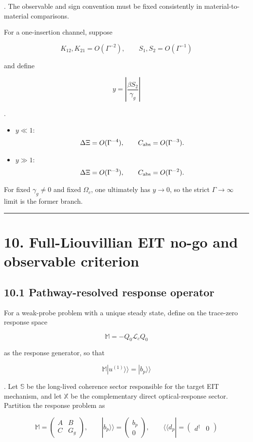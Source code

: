 \documentclass[
  10pt,
  a4paper,
]{article}
\providecommand{\tightlist}{%
  \setlength{\itemsep}{0pt}\setlength{\parskip}{0pt}}
\begin{document}
. The observable and sign convention must be fixed consistently in
material-to-material comparisons.

For a one-insertion channel, suppose

\[
K_{12},K_{21}=O(\Gamma^{-2}),
\qquad
S_1,S_2=O(\Gamma^{-1})
\]

and define

\[
y=\left|\frac{\beta S_2}{\gamma_g}\right|
\]

.

\begin{itemize}
\tightlist
\item
  \(y\ll1\): \[
  \Delta\Xi=O(\Gamma^{-4}),
  \qquad
  C_{\rm abs}=O(\Gamma^{-3}).
  \]
\item
  \(y\gg1\): \[
  \Delta\Xi=O(\Gamma^{-3}),
  \qquad
  C_{\rm abs}=O(\Gamma^{-2}).
  \]
\end{itemize}

For fixed \(\gamma_g\neq0\) and fixed \(\Omega_c\), one ultimately has
\(y\to0\), so the strict \(\Gamma\to\infty\) limit is the former branch.

\begin{center}\rule{0.5\linewidth}{0.5pt}\end{center}

\section{10. Full-Liouvillian EIT no-go and observable
criterion}\label{full-liouvillian-eit-no-go-and-observable-criterion}

\subsection{10.1 Pathway-resolved response
operator}\label{pathway-resolved-response-operator}

For a weak-probe problem with a unique steady state, define on the
trace-zero response space

\[
\mathbb M=-Q_0\mathcal L_cQ_0
\]

as the response generator, so that

\[
\mathbb M|u^{(1)}\rangle\!\rangle
=|b_p\rangle\!\rangle
\]

. Let \(\mathbb S\) be the long-lived coherence sector responsible for
the target EIT mechanism, and let \(\mathbb X\) be the complementary
direct optical-response sector. Partition the response problem as

\[
\mathbb M=
\begin{pmatrix}
A&B\\
C&G_g
\end{pmatrix},
\qquad
|b_p\rangle\!\rangle=
\begin{pmatrix}b_p\\0\end{pmatrix},
\qquad
\langle\!\langle d_p|=
\begin{pmatrix}d^\dagger&0\end{pmatrix}
\]
\end{document}
